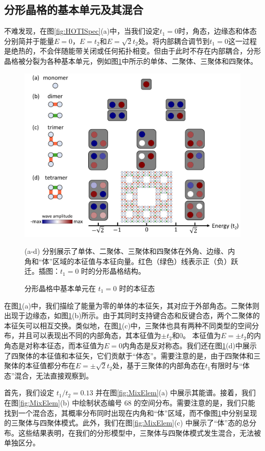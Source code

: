 \subsection{分形晶格的基本单元及其混合}
不难发现，在图\ref{fig:HOTISpec}(a)中，当我们设定$t_1=0$时，角态，边缘态和体态分别简并于能量$E=0$，$E=t_2$和$E=\sqrt{2}t_2$处。将内部耦合调节到$t_1=0$这一过程是绝热的，不会伴随能带关闭或任何拓扑相变。但由于此时不存在内部耦合，分形晶格被分裂为各种基本单元，例如图\ref{fig:Elemen}中所示的单体、二聚体、三聚体和四聚体。

\begin{figure}[htbp]
    \centering
    \includegraphics[width=0.75\linewidth]{figure/HOTITheo/Elemen.png}
    \caption{分形晶格中基本单元在 \( t_1=0 \) 时的本征态}(a-d) 分别展示了单体、二聚体、三聚体和四聚体在外角、边缘、内角和“体”区域的本征值与本征向量。红色（绿色）线表示正（负）跃迁。插图：\( t_1=0 \) 时的分形晶格结构。
    \label{fig:Elemen}
\end{figure}

在图\ref{fig:Elemen}(a)中，我们描绘了能量为零的单体的本征矢，其对应于外部角态。二聚体则出现于边缘态，如图\ref{fig:Elemen}(b)所示。由于其同时支持键合态和反键合态，两个二聚体的本征矢可以相互交换。类似地，在图\ref{fig:Elemen}(c)中，三聚体也具有两种不同类型的空间分布，并且可以表现出不同的内部角态，其本征值为$±t_2$和0。 本征值为$E=±t_2$的内角态是对称本征态，而本征值为$E=0$内角态是反对称态。我们还在图\ref{fig:Elemen}(d)中展示了四聚体的本征值和本征矢，它们贡献于“体态”。需要注意的是，由于四聚体和三聚体的本征值都分布在$E=±\sqrt{2}t_2$处，基于三聚体的内部角态在$t_1$有限时与“体态”混合，无法直接观察到。

首先，我们设定 \( t_1/t_2=0.13 \) 并在图\ref{fig:MixElem}(a) 中展示其能谱。接着，我们在图\ref{fig:MixElem}(b) 中绘制状态编号 68 的空间分布。需要注意的是，我们只能找到一个混合态，其概率分布同时出现在内角和“体”区域，而不像图\ref{fig:Elemen}中分别呈现的三聚体与四聚体模式。此外，我们在图\ref{fig:MixElem}(c) 中展示了“体”态的总分布。这些结果表明，在我们的分形模型中，三聚体与四聚体模式发生混合，无法被单独区分。

